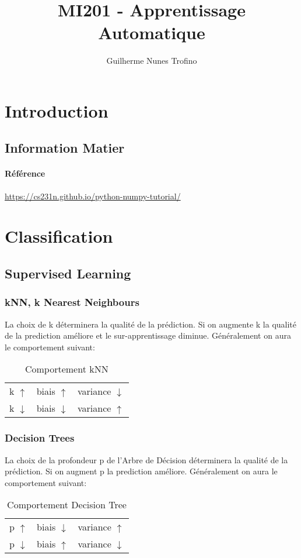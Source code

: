 \documentclass{article}
\title{MI201 - Apprentissage Automatique}
\author{Guilherme Nunes Trofino}
\begin{document}
\maketitle
\setlength{\parindent}{0pt}


\newpage\tableofcontents

\section{Introduction}



\subsection{Information Matier}
\paragraph{Référence}
\url{https://cs231n.github.io/python-numpy-tutorial/}


\section{Classification}

\subsection{Supervised Learning}
\subsubsection{kNN, k Nearest Neighbours}
La choix de k déterminera la qualité de la prédiction. Si on augmente k la qualité de la prediction améliore et le sur-apprentissage diminue. Généralement on aura le comportement suivant:
\begin{table}[H]
    \centering\begin{tabular}{lll}
        k $\uparrow  $ & biais $\uparrow  $ & variance $\downarrow$\\
        k $\downarrow$ & biais $\downarrow$ & variance $\uparrow$\\
    \end{tabular}
    \caption{Comportement kNN}
\end{table}

\subsubsection{Decision Trees}
La choix de la profondeur p de l'Arbre de Décision déterminera la qualité de la prédiction. Si on augment p la prediction améliore. Généralement on aura le comportement suivant:
\begin{table}[H]
    \centering\begin{tabular}{lll}
        p $\uparrow$   & biais $\downarrow$ & variance $\uparrow$\\
        p $\downarrow$ & biais $\uparrow  $ & variance $\downarrow$\\
    \end{tabular}
    \caption{Comportement Decision Tree}
\end{table}
\end{document}
